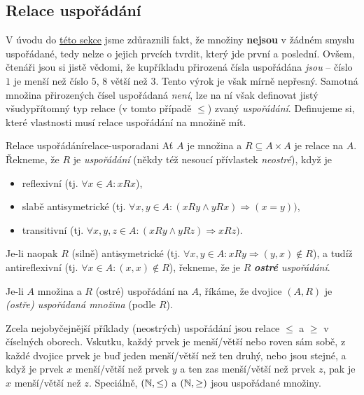 \subsection{Relace uspořádání}
\label{ssec:relace-usporadani}

V úvodu do \hyperref[sec:zakladni-pojmy-z-teorie-mnozin]{této sekce} jsme
zdůraznili fakt, že množiny \textbf{nejsou} v žádném smyslu uspořádané, tedy
nelze o jejich prvcích tvrdit, který jde první a poslední. Ovšem, čtenáři jsou
si jistě vědomi, že kupříkladu přirozená čísla uspořádána \emph{jsou} -- číslo
$1$ je menší než číslo $5$, $8$ větší než $3$. Tento výrok je však mírně
nepřesný. Samotná množina přirozených čísel uspořádaná \emph{není}, lze na ní
však definovat jistý všudypřítomný typ relace (v tomto případě $ \leq $) zvaný
\emph{uspořádání}. Definujeme si, které vlastnosti musí relace uspořádání na
množině mít.

\begin{definition}{Relace uspořádání}{relace-usporadani}
 Ať $A$ je množina a $R \subseteq A \times A$ je relace na $A$. Řekneme, že $R$
 je \emph{uspořádání} (někdy též nesoucí přívlastek \emph{neostré}), když je
 \begin{itemize}
  \item reflexivní (tj. $ \forall x \in A:xRx$),
  \item slabě antisymetrické (tj. $ \forall x,y \in A:(xRy \wedge yRx)
   \Rightarrow (x=y))$,
  \item transitivní (tj. $ \forall x,y,z \in A:(xRy \wedge yRz) \Rightarrow
   xRz)$.
 \end{itemize}
 Je-li naopak $R$ (silně) antisymetrické (tj. $ \forall x,y \in A:xRy
 \Rightarrow (y,x) \notin R$), a tudíž antireflexivní (tj. $ \forall x \in
 A:(x,x) \notin R$), řekneme, že je $R$ \emph{\textbf{ostré} uspořádání}.

 Je-li $A$ množina a $R$ (ostré) uspořádání na $A$, říkáme, že dvojice $(A,R)$ je
 \emph{(ostře) uspořádaná množina} (podle $R$).
\end{definition}

Zcela nejobyčejnější příklady (neostrých) uspořádání jsou relace $ \leq $ a $
\geq $ v číselných oborech. Vskut\-ku, každý prvek je menší/větší nebo roven sám
sobě, z každé dvojice prvek je buď jeden menší/větší než ten druhý, nebo jsou
stejné, a když je prvek $x$ menší/větší než prvek $y$ a ten zas menší/větší než
prvek $z$, pak je $x$ menší/větší než $z$. Speciálně, $(\mathbb{N}, \leq )$ a $(\mathbb{N}, \geq
)$ jsou uspořádané množiny.

